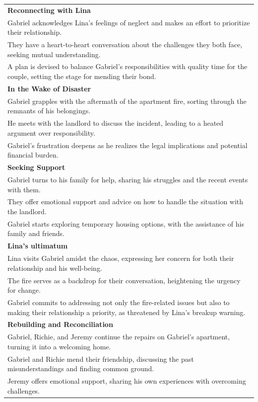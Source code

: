 \begin{small}
\begin{longtable}{p{}}
\textbf{Reconnecting with Lina}\\
Gabriel acknowledges Lina's feelings of neglect and makes an effort to prioritize their relationship.\\
They have a heart-to-heart conversation about the challenges they both face, seeking mutual understanding.\\
A plan is devised to balance Gabriel's responsibilities with quality time for the couple, setting the stage for mending their bond.\\


\textbf{In the Wake of Disaster}\\
Gabriel grapples with the aftermath of the apartment fire, sorting through the remnants of his belongings.\\
He meets with the landlord to discuss the incident, leading to a heated argument over responsibility.\\
Gabriel's frustration deepens as he realizes the legal implications and potential financial burden.\\





\textbf{Seeking Support}\\
Gabriel turns to his family for help, sharing his struggles and the recent events with them.\\
They offer emotional support and advice on how to handle the situation with the landlord.\\
Gabriel starts exploring temporary housing options, with the assistance of his family and friends.\\





\textbf{Lina's ultimatum}\\
Lina visits Gabriel amidst the chaos, expressing her concern for both their relationship and his well-being.\\
The fire serves as a backdrop for their conversation, heightening the urgency for change.\\
Gabriel commits to addressing not only the fire-related issues but also to making their relationship a priority, as threatened by Lina's breakup warning.\\


\textbf{Rebuilding and Reconciliation}\\
Gabriel, Richie, and Jeremy continue the repairs on Gabriel's apartment, turning it into a welcoming home.\\
Gabriel and Richie mend their friendship, discussing the past misunderstandings and finding common ground.\\
Jeremy offers emotional support, sharing his own experiences with overcoming challenges.\\






\end{longtable}
\end{small}
